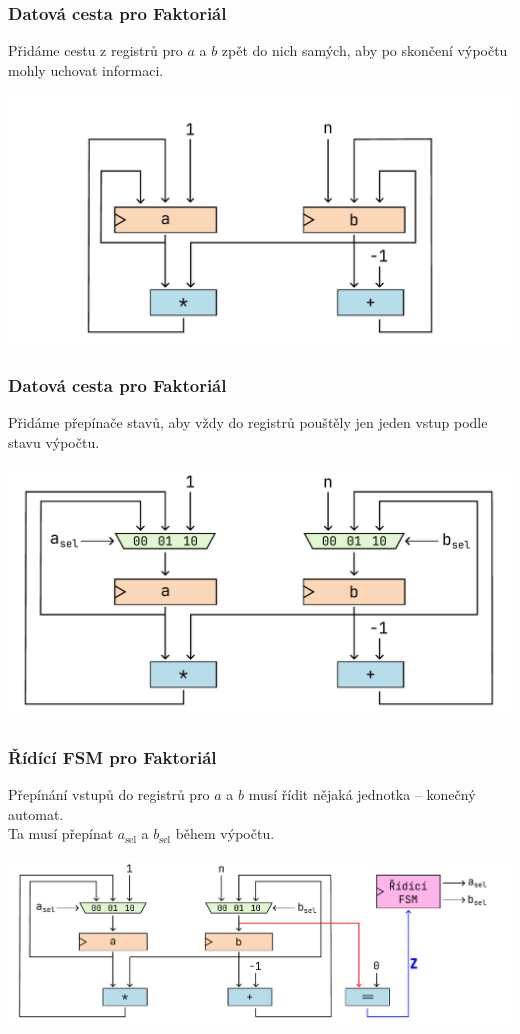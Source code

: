 \documentclass[aspectratio=169,11pt,svgnames,handout]{beamer}
\begin{document}
\begin{frame}
 \frametitle{Datová cesta pro Faktoriál}
 Přidáme cestu z registrů pro $a$ a $b$ zpět do nich samých, aby po skončení
 výpočtu mohly uchovat informaci.
 \begin{center}
  \includegraphics[width=.75\textwidth]{factorial-circuit-6.pdf}
 \end{center}
\end{frame}

\begin{frame}
 \frametitle{Datová cesta pro Faktoriál}
 Přidáme přepínače stavů, aby vždy do registrů pouštěly jen jeden vstup podle
 stavu výpočtu.
 \begin{center}
  \includegraphics[width=.75\textwidth]{factorial-circuit-7.pdf}
 \end{center}
\end{frame}

\begin{frame}
 \frametitle{Řídící FSM pro Faktoriál}
 Přepínání vstupů do registrů pro $a$ a $b$ musí řídit nějaká jednotka --
 konečný automat.\pause\\
 Ta musí přepínat $a_{\text{sel}}$ a $b_{\text{sel}}$ během výpočtu.
 \begin{center}
  \includegraphics[width=\textwidth]{factorial-circuit-8.pdf}
 \end{center}
\end{frame}
\end{document}
